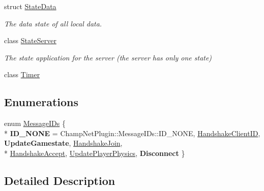 \begin{DoxyCompactItemize}
struct \hyperlink{struct_state_data}{State\-Data}
\begin{DoxyCompactList}\small\item\em The data state of all local data. \end{DoxyCompactList}\item 
class \hyperlink{class_state_server}{State\-Server}
\begin{DoxyCompactList}\small\item\em The state application for the server (the server has only one state) \end{DoxyCompactList}\item 
class \hyperlink{class_timer}{Timer}
\end{DoxyCompactItemize}
\subsection*{Enumerations}
\begin{DoxyCompactItemize}
\item 
enum \hyperlink{group__server_ga4301bf0fa2a92b524daa9d4d1f9aa9e3}{Message\-I\-Ds} \{ \\*
{\bfseries I\-D\-\_\-\-N\-O\-N\-E} = Champ\-Net\-Plugin\-:\-:Message\-I\-Ds\-:\-:I\-D\-\_\-\-N\-O\-N\-E, 
\hyperlink{group__server_gga4301bf0fa2a92b524daa9d4d1f9aa9e3a59f5ae9c1d42ffd00714368264eab9b9}{Handshake\-Client\-I\-D}, 
{\bfseries Update\-Gamestate}, 
\hyperlink{group__server_gga4301bf0fa2a92b524daa9d4d1f9aa9e3ab1eef7245d0a1b3e7cd8ed83fe0a3f8b}{Handshake\-Join}, 
\\*
\hyperlink{group__server_gga4301bf0fa2a92b524daa9d4d1f9aa9e3a4e3ac0d64fe8a89bf1ce5dd7b99a3c27}{Handshake\-Accept}, 
\hyperlink{group__server_gga4301bf0fa2a92b524daa9d4d1f9aa9e3a83a27501d9ed8bebed49bcd5bb152f9e}{Update\-Player\-Physics}, 
{\bfseries Disconnect}
 \}
\end{DoxyCompactItemize}


\subsection{Detailed Description}


